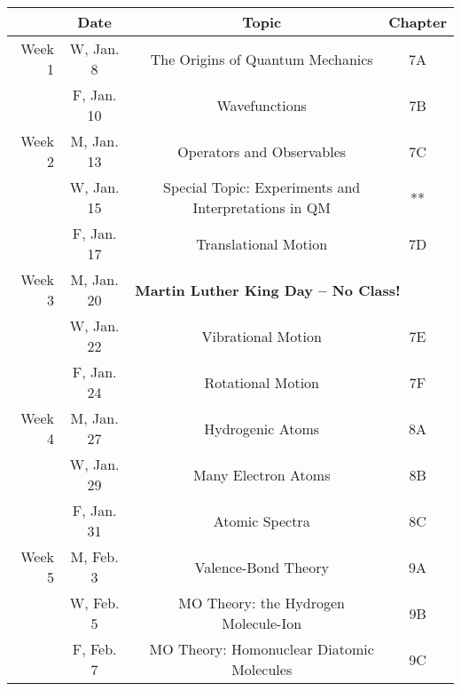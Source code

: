 \documentclass[12pt, letterpaper]{article}
\begin{document}
\begin{tabular}{rcccc}
& Date && Topic & Chapter\\
\midrule
Week 1 & W, Jan. 8&& The Origins of Quantum Mechanics & 7A\\
& F, Jan. 10&& Wavefunctions & 7B\\
\midrule
Week 2 & M, Jan. 13&& Operators and Observables & 7C\\
& W, Jan. 15&& Special Topic: Experiments and Interpretations in QM & **\\
& F, Jan. 17&& Translational Motion & 7D\\
\midrule
Week 3 & M, Jan. 20& \multicolumn{3}{l}{\textbf{Martin Luther King Day -- No Class!}}\\
& W, Jan. 22&& Vibrational Motion & 7E\\
& F, Jan. 24&& Rotational Motion & 7F\\
\midrule
Week 4 & M, Jan. 27&& Hydrogenic Atoms & 8A\\
& W, Jan. 29&& Many Electron Atoms & 8B\\
& F, Jan. 31&& Atomic Spectra & 8C\\
\midrule
Week 5 & M, Feb. 3&& Valence-Bond Theory & 9A\\
& W, Feb. 5&& MO Theory: the Hydrogen Molecule-Ion & 9B\\
& F, Feb. 7&& MO Theory: Homonuclear Diatomic Molecules & 9C\\
\end{tabular}
\end{document}
